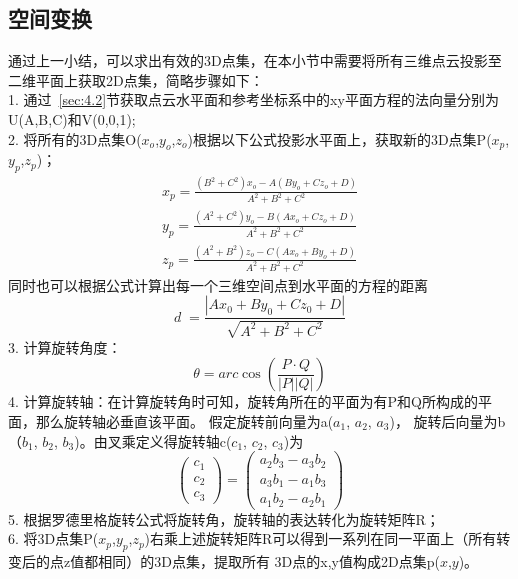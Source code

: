 \subsection{空间变换}
\label{sec:4.4.2}
通过上一小结，可以求出有效的3D点集，在本小节中需要将所有三维点云投影至二维平面上获取2D点集，简略步骤如下：\\
1.	通过~\ref{sec:4.2}节获取点云水平面和参考坐标系中的xy平面方程的法向量分别为U(A,B,C)和V(0,0,1);\\
2.	将所有的3D点集O($x_o$,$y_o$,$z_o$)根据以下公式投影水平面上，获取新的3D点集P($x_p$,$y_p$,$z_p$)；
\begin{equation}
  \begin{split}
  x_p=\frac{(B^2+C^2)x_o-A(By_o+Cz_o+D)}{A^2+B^2+C^2}\\
  y_p=\frac{(A^2+C^2)y_o-B(Ax_o+Cz_o+D)}{A^2+B^2+C^2}\\
  z_p=\frac{(A^2+B^2)z_o-C(Ax_o+By_o+D)}{A^2+B^2+C^2}
  \label{equ:pxyz}
  \end{split}
\end{equation}
同时也可以根据公式计算出每一个三维空间点到水平面的方程的距离
\begin{equation}
d\;=\frac{\left|Ax_0+By_0+Cz_0+D\right|}{\sqrt{A^2+B^2+C^2}}
\end{equation}
3.	计算旋转角度：
\begin{equation}
\theta=arc\cos(\frac{P\cdot Q}{\left|P\right|\left|Q\right|})
\end{equation}
4.	计算旋转轴：在计算旋转角时可知，旋转角所在的平面为有P和Q所构成的平面，那么旋转轴必垂直该平面。
假定旋转前向量为a($a_1$, $a_2$, $a_3$)， 旋转后向量为b（$b_1$, $b_2$, $b_3$)。由叉乘定义得旋转轴c($c_1$, $c_2$, $c_3$)为
\begin{equation}
\begin{pmatrix}c_1\\c_2\\c_3\end{pmatrix}=\begin{pmatrix}a_2b_3-a_3b_2\\a_3b_1-a_1b_3\\a_1b_2-a_2b_1\end{pmatrix}
\end{equation}
5.	根据罗德里格旋转公式将旋转角，旋转轴的表达转化为旋转矩阵R；\\
6.	将3D点集P($x_p$,$y_p$,$z_p$)右乘上述旋转矩阵R可以得到一系列在同一平面上（所有转变后的点z值都相同）的3D点集，提取所有
3D点的x,y值构成2D点集p($x$,$y$)。
